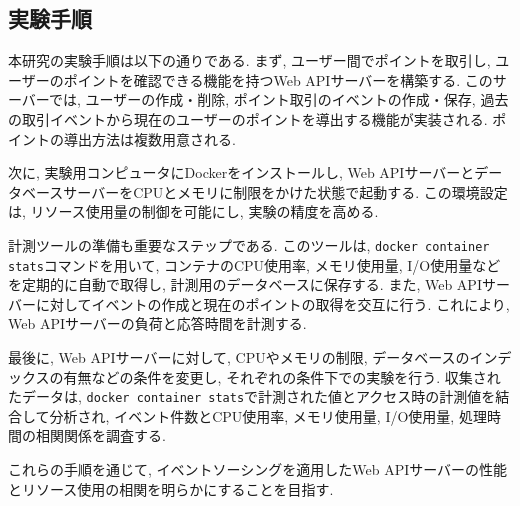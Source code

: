 \documentclass[../../../main]{subfiles}
\begin{document}
    \subsection{実験手順}\label{subsec:method-procedure}

    本研究の実験手順は以下の通りである. まず, ユーザー間でポイントを取引し, ユーザーのポイントを確認できる機能を持つWeb APIサーバーを構築する. このサーバーでは, ユーザーの作成・削除, ポイント取引のイベントの作成・保存, 過去の取引イベントから現在のユーザーのポイントを導出する機能が実装される. ポイントの導出方法は複数用意される.

    次に, 実験用コンピュータにDockerをインストールし, Web APIサーバーとデータベースサーバーをCPUとメモリに制限をかけた状態で起動する. この環境設定は, リソース使用量の制御を可能にし, 実験の精度を高める.

    計測ツールの準備も重要なステップである. このツールは, \texttt{docker container stats}コマンドを用いて, コンテナのCPU使用率, メモリ使用量, I/O使用量などを定期的に自動で取得し, 計測用のデータベースに保存する. また, Web APIサーバーに対してイベントの作成と現在のポイントの取得を交互に行う. これにより, Web APIサーバーの負荷と応答時間を計測する.

    最後に, Web APIサーバーに対して, CPUやメモリの制限, データベースのインデックスの有無などの条件を変更し, それぞれの条件下での実験を行う. 収集されたデータは, \texttt{docker container stats}で計測された値とアクセス時の計測値を結合して分析され, イベント件数とCPU使用率, メモリ使用量, I/O使用量, 処理時間の相関関係を調査する.

    これらの手順を通じて, イベントソーシングを適用したWeb APIサーバーの性能とリソース使用の相関を明らかにすることを目指す.
\end{document}
